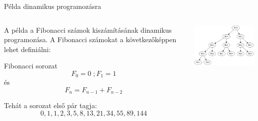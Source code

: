 \documentclass[english, aspectratio=169]{beamer}
\begin{document}
\begin{frame}{Példa dinamikus programozásra}
\begin{columns}
\begin{column}{.5\textwidth}
A példa a Fibonacci számok kiszámításának dinamikus programozása. A Fibonacci számokat a következőképpen lehet definiálni:\\
\begin{block}{Fibonacci sorozat}
\[
F_{0}=0\;;F_{1}=1
\]
és
\[
F_{n}=F_{n-1}+F_{n-2}
\]
\end{block}
Tehát a sorozat első pár tagja:
\[
0, 1, 1, 2, 3, 5, 8, 13, 21, 34, 55, 89, 144
\]
\end{column}
\begin{column}{.5\textwidth}
\begin{center}
\includegraphics[width=7cm, keepaspectratio]{graphs/solving_4.png}
\end{center}
\end{column}
\end{columns}
\end{frame}
\end{document}
